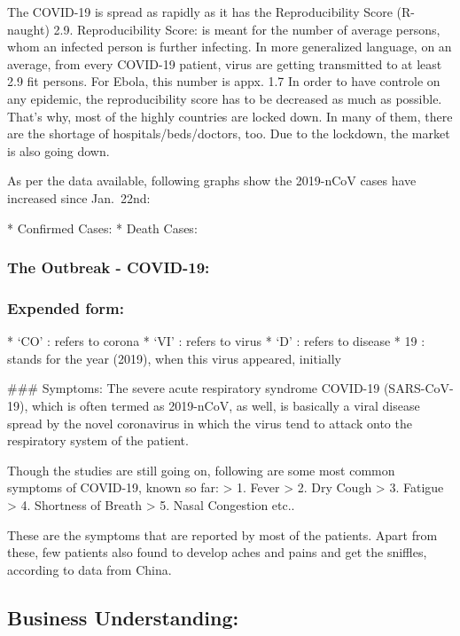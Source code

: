 \documentclass[11pt]{article}
\begin{document}
     The COVID-19 is spread as rapidly as it has the Reproducibility Score
(R-naught) 2.9. Reproducibility Score: is meant for the number of
average persons, whom an infected person is further infecting. In more
generalized language, on an average, from every COVID-19 patient, virus
are getting transmitted to at least 2.9 fit persons. For Ebola, this
number is appx. 1.7 In order to have controle on any epidemic, the
reproducibility score has to be decreased as much as possible. That's
why, most of the highly countries are locked down. In many of them,
there are the shortage of hospitals/beds/doctors, too. Due to the
lockdown, the market is also going down.

As per the data available, following graphs show the 2019-nCoV cases
have increased since Jan.~22nd:

 * Confirmed Cases: * Death Cases: 

    \hypertarget{the-outbreak---covid-19}{%
\subsubsection{The Outbreak - COVID-19:}\label{the-outbreak---covid-19}}

\hypertarget{expended-form}{%
\subsubsection{Expended form:}\label{expended-form}}

 * `CO' : refers to corona * `VI' : refers to virus * `D' : refers to
disease * 19 : stands for the year (2019), when this virus appeared,
initially 

     \#\#\# Symptoms: The severe acute respiratory syndrome COVID-19
(SARS-CoV-19), which is often termed as 2019-nCoV, as well, is basically
a viral disease spread by the novel coronavirus in which the virus tend
to attack onto the respiratory system of the patient.

Though the studies are still going on, following are some most common
symptoms of COVID-19, known so far: \textgreater{} 1. Fever
\textgreater{} 2. Dry Cough \textgreater{} 3. Fatigue \textgreater{} 4.
Shortness of Breath \textgreater{} 5. Nasal Congestion etc..

These are the symptoms that are reported by most of the patients. Apart
from these, few patients also found to develop aches and pains and get
the sniffles, according to data from China. 

    \hypertarget{business-understanding}{%
\subsection{Business Understanding:}\label{business-understanding}}
\end{document}
